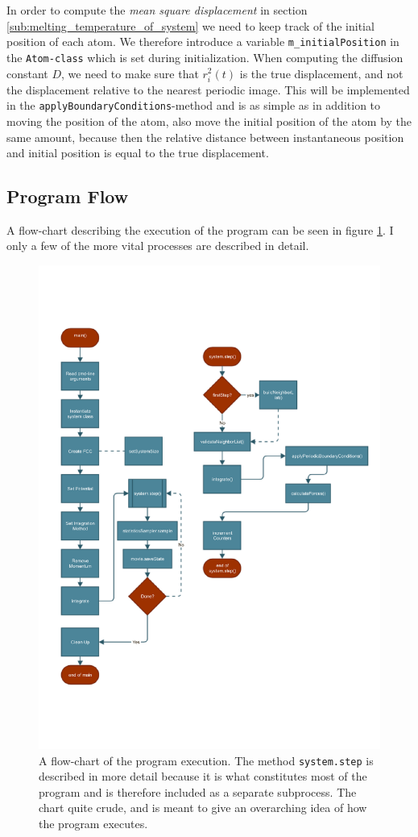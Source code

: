 \documentclass[a4paper]{article}
\begin{document}
    In order to compute the \emph{mean square displacement} in section
    \ref{sub:melting_temperature_of_system} we need to keep track of the
    initial position of each atom. We therefore introduce a variable
    \texttt{m\_initialPosition} in the \texttt{Atom-class} which is set during
    initialization.  When computing the diffusion constant $D$, we need to make
    sure that $r_i^2(t)$ is the true displacement, and not the displacement
    relative to the nearest periodic image. This will be implemented in the
    \texttt{applyBoundaryConditions}-method and is as simple as in addition to
    moving the position of the atom, also move the initial position of the atom
    by the same amount, because then the relative distance between instantaneous
    position and initial position is equal to the true displacement.

    \subsection{Program Flow}
    \label{sub:program_flow}

    A flow-chart describing the execution of the program can be seen in
    figure \ref{fig:flowchart}. I only a few of the more vital processes are
    described in detail.
    \begin{figure}[h]
        \centering \includegraphics[width=0.8\linewidth]{flow_chart.pdf}
        \caption[Flow chart]{A flow-chart of the program execution. The method
            \texttt{system.step} is described in more detail because it is what
            constitutes most of the program and is therefore included as a
        separate subprocess. The chart quite crude, and is meant to give an
    overarching idea of how the program executes.}
        \label{fig:flowchart}
    \end{figure}
\end{document}
